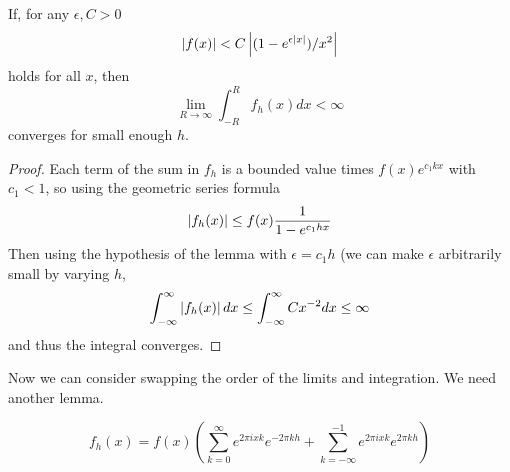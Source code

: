 \documentclass{homework}
\begin{document}
\begin{solution}
\begin{lemma}
                                                                                If, for any $\epsilon,C>0$
                                                                                \[\left|f(x)\right| <  C\left|(1-e^{\epsilon\left|x\right|})/x^2\right|\] 
                                                                                holds for all $x$,
                                                                                then 
                                                                                \[ \lim_{R\to\infty} \int_{-R}^R f_h(x) dx < \infty\] converges for small enough $h$.
                                                                                \end{lemma}
                                                                                \begin{proof}
                                                                                Each term of the sum in $f_h$ is a bounded value times $f(x)e^{c_1kx}$ with $c_1<1$, so using the geometric series formula
                                                                                \[
                                                                                \left|f_h(x)\right| \leq f(x)\frac{1}{1-e^{c_1 hx}}
                                                                                \]
                                                                                Then using the hypothesis of the lemma with $\epsilon = c_1h$ (we can make $\epsilon$ arbitrarily small by varying $h$,
                                                                                \[
                                                                                \int_{-\infty}^\infty \left|f_h(x)\right|dx \leq \int_{-\infty}^\infty Cx^{-2} dx \leq \infty
                                                                                \]
                                                                                and thus the integral converges. 
                                                                                \end{proof}
                                                                                Now we can consider swapping the order of the limits and integration. We need another lemma.
                                                                                \begin{lemma}\label{fh_converges_normally}
                                                                                \[
                                                                                f_h(x) = f(x)\left(\sum_{k=0}^{\infty}e^{2\pi i xk}e^{-2\pi kh} + \sum_{k=-\infty}^{-1} e^{2\pi i xk}e^{2\pi kh}\right)
\]
\end{lemma}
\end{solution}
\end{document}
